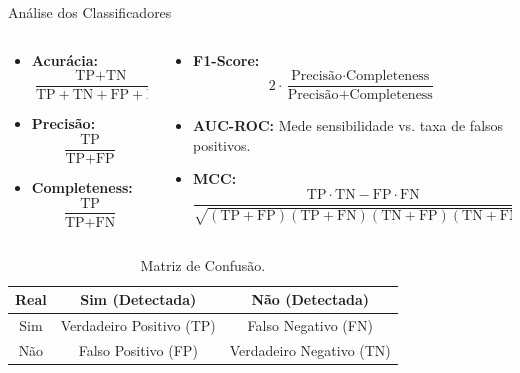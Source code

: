 \begin{frame}[c]{Análise dos Classificadores}
    \begin{columns}[c]
        \begin{column}{0.48\textwidth}
            \vspace{0.4cm}
            \begin{itemize}
                \item \textbf{Acurácia:} 
                \[
                \frac{\text{TP} + \text{TN}}{\text{TP} + \text{TN} + \text{FP} + \text{FN}}
                \]
                \item \textbf{Precisão:} 
                \[
                \frac{\text{TP}}{\text{TP} + \text{FP}}
                \]
                \item \textbf{Completeness:} 
                \[
                \frac{\text{TP}}{\text{TP} + \text{FN}}
                \]
            \end{itemize}
        \end{column}
        \begin{column}{0.48\textwidth}
            \vspace{0.4cm}
            \begin{itemize}
                \item \textbf{F1-Score:} 
                \[
                2 \cdot \frac{\text{Precisão} \cdot \text{Completeness}}{\text{Precisão} + \text{Completeness}}
                \]
                \item \textbf{AUC-ROC:} Mede sensibilidade vs. taxa de falsos positivos.
                \item \textbf{MCC:} 
                \[
                \frac{\text{TP} \cdot \text{TN} - \text{FP} \cdot \text{FN}}{\sqrt{(\text{TP} + \text{FP})(\text{TP} + \text{FN})(\text{TN} + \text{FP})(\text{TN} + \text{FN})}}
                \]
            \end{itemize}
        \end{column}
    \end{columns}
    \vspace{0.5cm}
    \begin{table}[!ht]
        \centering
        \scriptsize
        \begin{tabular}{|c|c|c|}
            \hline
            \textbf{Real} & \textbf{Sim (Detectada)} & \textbf{Não (Detectada)} \\ \hline
            Sim           & Verdadeiro Positivo (TP) & Falso Negativo (FN)      \\ \hline
            Não           & Falso Positivo (FP)      & Verdadeiro Negativo (TN) \\ \hline
        \end{tabular}
        \caption{Matriz de Confusão.}
    \end{table}
\end{frame}

